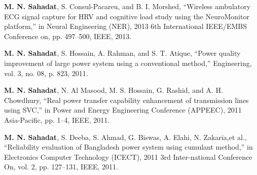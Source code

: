 \begin{cvitems}
\item{\textbf{M. N. Sahadat},  S.  Consul-Pacareu,  and  B.  I.  Morshed,  “Wireless  ambulatory ECG signal capture for HRV and cognitive load study using the NeuroMonitor platform,” in Neural Engineering (NER), 2013 6th International IEEE/EMBS Conference on, pp. 497–500, IEEE, 2013.}
\item{\textbf{M. N. Sahadat}, S. Hossain, A. Rahman, and S. T. Atique, “Power quality improvement of large power system using a conventional method,” Engineering, vol. 3, no. 08, p. 823, 2011.}
\item{ \textbf{M. N. Sahadat}, N. Al Masood, M. S. Hossain, G. Rashid, and A. H. Chowdhury, “Real power transfer capability enhancement of transmission lines using SVC,” in Power  and  Energy  Engineering  Conference  (APPEEC),  2011 Asia-Pacific, pp. 1–4, IEEE, 2011.}
\item{\textbf{M. N. Sahadat},  S.  Deeba,  S.  Ahmad,  G.  Biswas,  A.  Elahi,  N.  Zakaria,et al., “Reliability evaluation of Bangladesh power system using cumulant method,”  in Electronics  Computer  Technology  (ICECT),  2011  3rd  Inter-national Conference On, vol. 2, pp. 127–131, IEEE, 2011.}
\end{cvitems}